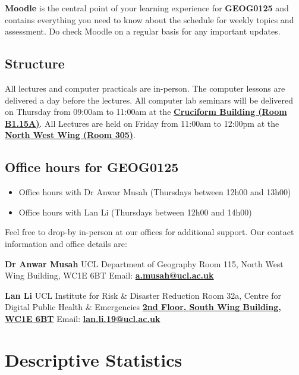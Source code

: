 \documentclass[
]{book}
\begin{document}
\textbf{Moodle} is the central point of your learning experience for \textbf{GEOG0125} and contains everything you need to know about the schedule for weekly topics and assessment. Do check Moodle on a regular basis for any important updates.

\hypertarget{structure}{%
\section*{Structure}\label{structure}}

All lectures and computer practicals are in-person. The computer lessons are delivered a day before the lectures. All computer lab seminars will be delivered on Thursday from 09:00am to 11:00am at the \href{https://www.ucl.ac.uk/maps/cruciform-building}{\textbf{Cruciform Building (Room B1.15A)}}. All Lectures are held on Friday from 11:00am to 12:00pm at the \href{https://www.ucl.ac.uk/maps/north-west-wing-building}{\textbf{North West Wing (Room 305)}}.

\hypertarget{office-hours-for-geog0125}{%
\section*{Office hours for GEOG0125}\label{office-hours-for-geog0125}}

\begin{itemize}
\item
  Office hours with Dr Anwar Musah (Thursdays between 12h00 and 13h00)
\item
  Office hours with Lan Li (Thursdays between 12h00 and 14h00)
\end{itemize}

Feel free to drop-by in-person at our offices for additional support. Our contact information and office details are:

\textbf{Dr Anwar Musah}
UCL Department of Geography
Room 115, North West Wing Building, WC1E 6BT
Email: \href{a.musah@ucl.ac.uk}{\textbf{a.musah@ucl.ac.uk}}

\textbf{Lan Li}
UCL Institute for Risk \& Disaster Reduction
Room 32a, Centre for Digital Public Health \& Emergencies
\href{http://www.ucl.ac.uk/maps/south-wing}{\textbf{2nd Floor, South Wing Building, WC1E 6BT}}
Email: \href{**lan.li.19@ucl.ac.uk**}{\textbf{lan.li.19@ucl.ac.uk}}

\hypertarget{descriptive-statistics}{%
\chapter{Descriptive Statistics}\label{descriptive-statistics}}
\end{document}
